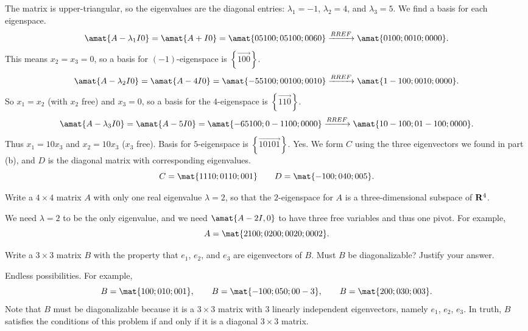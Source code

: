\begin{problems}
\begin{solution}
\begin{subproblems}
  \subproblem The matrix is upper-triangular, so the eigenvalues are
  the diagonal entries: $\lambda_1 = -1$, $\lambda_2 = 4$, and
  $\lambda_3 = 5$.
  \subproblem We find a basis for each eigenspace.
  \[\amat{A-\lambda_1I 0} =
    \amat{A+I 0} =
    \amat{0 5 10 0; 0 5 10 0; 0 0 6 0}
    \xrightarrow[]{RREF}
    \amat{0 1 0 0; 0 0 1 0; 0 0 0 0}.\]
  This means $x_2 = x_3 = 0$, so a basis for $(-1)$-eigenspace
  is $\left\{\vec{1 0 0}\right\}$.
  \[\amat{A-\lambda_2I 0} =
    \amat{A-4I 0} =
    \amat{-5 5 10 0; 0 0 10 0; 0 0 1 0}
    \xrightarrow[]{RREF}
    \amat{1 -1 0 0; 0 0 1 0; 0 0 0 0}.\]
  So $x_1 = x_2$ (with $x_2$ free) and $x_3 = 0$, so
  a basis for the $4$-eigenspace is $\left\{\vec{1 1 0}\right\}$.
  \[\amat{A-\lambda_3I 0} =
    \amat{A-5I 0} = \amat{-6 5 10 0; 0 -1 10 0; 0 0 0 0}
    \xrightarrow[]{RREF} \amat{1 0 -10 0; 0 1 -10 0; 0 0 0 0}.\] Thus
  $x_1 = 10x_3$ and $x_2 = 10x_3$ ($x_3$ free). Basis for
  $5$-eigenspace is $\left\{ \vec{10 10 1} \right\}$.
  \subproblem Yes.  We form $C$ using the three eigenvectors we found
  in part (b), and $D$ is the diagonal matrix with corresponding
  eigenvalues.
  \[C = \mat{1 1 10; 0 1 10; 0 0 1} \qquad
    D = \mat{-1 0 0; 0 4 0; 0 0 5}.\]  
\end{subproblems}
\end{solution}



\problem %
Write a $4 \times 4$ matrix $A$ with only one real eigenvalue $\lambda = 2$, so
that the $2$-eigenspace for $A$ is a three-dimensional subspace of ${\bf
  R}^4$.  %

\begin{solution}
  We need $\lambda=2$ to be the only eigenvalue, and we need $\amat{A-2I, 0}$ to
  have three free variables and thus one pivot.  For example,
    \[A = \mat{2 1 0 0; 0 2 0 0; 0 0 2 0; 0 0 0 2}.\] %
\end{solution}

\problem %
Write a $3 \times 3$ matrix $B$ with the property that $e_1$, $e_2$, and $e_3$
are eigenvectors of $B$.  Must $B$ be diagonalizable?  Justify your answer.

\begin{solution}
Endless possibilities.  For example,
\[B = \mat{1 0 0; 0 1 0; 0 0 1}, \qquad B = \mat{-1 0 0; 0 5 0; 0 0 -3}, \qquad
  B = \mat{2 0 0; 0 3 0; 0 0 3}.\] Note that $B$ must be diagonalizable because
it is a $3 \times 3$ matrix with $3$ linearly independent eigenvectors, namely
$e_1$, $e_2$, $e_3$.  In truth, $B$ satisfies the conditions of this problem if
and only if it is a diagonal $3 \times 3$ matrix.
\end{solution}


\end{problems}

